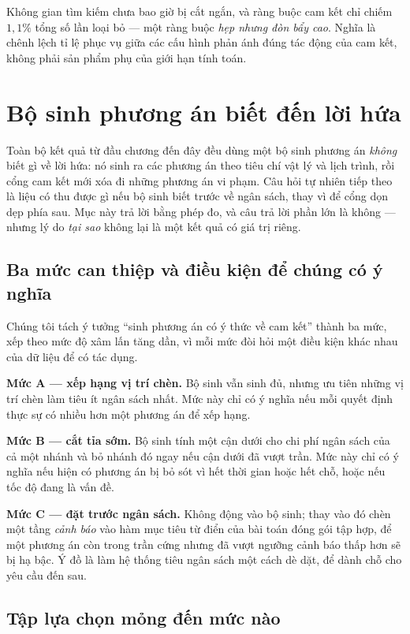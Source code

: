 Không gian tìm kiếm chưa bao giờ bị cắt ngắn, và ràng buộc cam kết chỉ chiếm $1{,}1\%$ tổng số
lần loại bỏ --- một ràng buộc \emph{hẹp nhưng đòn bẩy cao}. Nghĩa là chênh lệch tỉ lệ phục vụ
giữa các cấu hình phản ánh đúng tác động của cam kết, không phải sản phẩm phụ của giới hạn tính
toán.

\section{Bộ sinh phương án biết đến lời hứa}
\label{muc:bosinh}

Toàn bộ kết quả từ đầu chương đến đây đều dùng một bộ sinh phương án \emph{không} biết gì về
lời hứa: nó sinh ra các phương án theo tiêu chí vật lý và lịch trình, rồi cổng cam kết mới xóa
đi những phương án vi phạm. Câu hỏi tự nhiên tiếp theo là liệu có thu được gì nếu bộ sinh biết
trước về ngân sách, thay vì để cổng dọn dẹp phía sau. Mục này trả lời bằng phép đo, và câu trả
lời phần lớn là không --- nhưng lý do \emph{tại sao} không lại là một kết quả có giá trị riêng.

\subsection{Ba mức can thiệp và điều kiện để chúng có ý nghĩa}

Chúng tôi tách ý tưởng ``sinh phương án có ý thức về cam kết'' thành ba mức, xếp theo mức độ
xâm lấn tăng dần, vì mỗi mức đòi hỏi một điều kiện khác nhau của dữ liệu để có tác dụng.

\textbf{Mức A --- xếp hạng vị trí chèn.} Bộ sinh vẫn sinh đủ, nhưng ưu tiên những vị trí chèn
làm tiêu ít ngân sách nhất. Mức này chỉ có ý nghĩa nếu mỗi quyết định thực sự có nhiều hơn một
phương án để xếp hạng.

\textbf{Mức B --- cắt tỉa sớm.} Bộ sinh tính một cận dưới cho chi phí ngân sách của cả một
nhánh và bỏ nhánh đó ngay nếu cận dưới đã vượt trần. Mức này chỉ có ý nghĩa nếu hiện có phương
án bị bỏ sót vì hết thời gian hoặc hết chỗ, hoặc nếu tốc độ đang là vấn đề.

\textbf{Mức C --- đặt trước ngân sách.} Không động vào bộ sinh; thay vào đó chèn một tầng
\emph{cảnh báo} vào hàm mục tiêu từ điển của bài toán đóng gói tập hợp, để một phương án còn
trong trần cứng nhưng đã vượt ngưỡng cảnh báo thấp hơn sẽ bị hạ bậc. Ý đồ là làm hệ thống tiêu
ngân sách một cách dè dặt, để dành chỗ cho yêu cầu đến sau.

\subsection{Tập lựa chọn mỏng đến mức nào}

